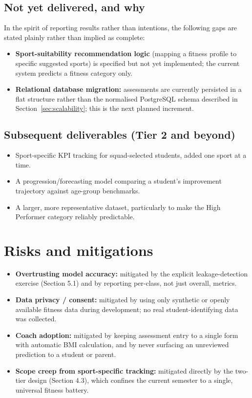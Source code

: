 \documentclass[11pt,a4paper]{article}
\begin{document}
\subsection{Not yet delivered, and why}
In the spirit of reporting results rather than
intentions, the following gaps are stated plainly rather
than implied as complete:
\begin{itemize}[leftmargin=0.7cm]
    \item \textbf{Sport-suitability recommendation logic} (mapping a fitness profile to specific suggested sports) is specified but not yet implemented; the current system predicts a fitness category only.
    \item \textbf{Relational database migration:} assessments are currently persisted in a flat structure rather than the normalised PostgreSQL schema described in Section~\ref{sec:scalability}; this is the next planned increment.
\end{itemize}

\subsection{Subsequent deliverables (Tier 2 and beyond)}
\begin{itemize}[leftmargin=0.7cm]
    \item Sport-specific KPI tracking for squad-selected students, added one sport at a time.
    \item A progression/forecasting model comparing a student's improvement trajectory against age-group benchmarks.
    \item A larger, more representative dataset, particularly to make the High Performer category reliably predictable.
\end{itemize}

\section{Risks and mitigations}
\begin{itemize}[leftmargin=0.7cm]
    \item \textbf{Overtrusting model accuracy:} mitigated by the explicit leakage-detection exercise (Section 5.1) and by reporting per-class, not just overall, metrics.
    \item \textbf{Data privacy / consent:} mitigated by using only synthetic or openly available fitness data during development; no real student-identifying data was collected.
    \item \textbf{Coach adoption:} mitigated by keeping assessment entry to a single form with automatic BMI calculation, and by never surfacing an unreviewed prediction to a student or parent.
    \item \textbf{Scope creep from sport-specific tracking:} mitigated directly by the two-tier design (Section 4.3), which confines the current semester to a single, universal fitness battery.
\end{itemize}
\end{document}
